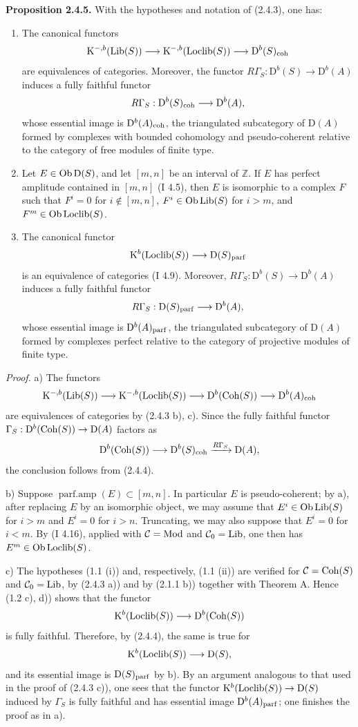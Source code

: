 \documentclass[11pt]{article}
\begin{document}
\textbf{Proposition 2.4.5.} With the hypotheses and notation of (2.4.3), one has:
\begin{enumerate}[label=\alph*)]
\item The canonical functors
\[
\mathrm K^{-,b}(\operatorname{Lib}(S))\longrightarrow\mathrm K^{-,b}(\operatorname{Loclib}(S))\longrightarrow \mathrm D^b(S)_{\mathrm{coh}}
\]
are equivalences of categories. Moreover, the functor $R\Gamma_S:\mathrm D^b(S)\to\mathrm D^b(A)$ induces a fully faithful functor
\[
R\Gamma_S:\mathrm D^b(S)_{\mathrm{coh}}\longrightarrow \mathrm D^b(A),
\]
whose essential image is $\mathrm D^b(A)_{\mathrm{coh}}$, the triangulated subcategory of $\mathrm D(A)$ formed by complexes with bounded cohomology and pseudo-coherent relative to the category of free modules of finite type.
\item Let $E\in\operatorname{Ob}\mathrm D(S)$, and let $[m,n]$ be an interval of $\mathbb Z$. If $E$ has perfect amplitude contained in $[m,n]$ (I 4.5), then $E$ is isomorphic to a complex $F$ such that $F^i=0$ for $i\notin[m,n]$, $F^i\in\operatorname{Ob}\operatorname{Lib}(S)$ for $i>m$, and $F^m\in\operatorname{Ob}\operatorname{Loclib}(S)$.
\item The canonical functor
\[
\mathrm K^b(\operatorname{Loclib}(S))\longrightarrow \mathrm D(S)_{\mathrm{parf}}
\]
is an equivalence of categories (I 4.9). Moreover, $R\Gamma_S:\mathrm D^b(S)\to\mathrm D^b(A)$ induces a fully faithful functor
\[
R\Gamma_S:\mathrm D(S)_{\mathrm{parf}}\longrightarrow\mathrm D^b(A),
\]
whose essential image is $\mathrm D^b(A)_{\mathrm{parf}}$, the triangulated subcategory of $\mathrm D(A)$ formed by complexes perfect relative to the category of projective modules of finite type.
\end{enumerate}

\emph{Proof.} a) The functors
\[
\mathrm K^{-,b}(\operatorname{Lib}(S))\longrightarrow\mathrm K^{-,b}(\operatorname{Loclib}(S))\longrightarrow
\mathrm D^b(\operatorname{Coh}(S))\longrightarrow\mathrm D^b(A)_{\mathrm{coh}}
\]
are equivalences of categories by (2.4.3 b), c). Since the fully faithful functor $\Gamma_S:\mathrm D^b(\operatorname{Coh}(S))\to\mathrm D(A)$ factors as
\[
\mathrm D^b(\operatorname{Coh}(S))\longrightarrow\mathrm D^b(S)_{\mathrm{coh}}\xrightarrow{R\Gamma_S}\mathrm D(A),
\]
the conclusion follows from (2.4.4).

b) Suppose $\operatorname{parf.amp}(E)\subset[m,n]$. In particular $E$ is pseudo-coherent; by a), after replacing $E$ by an isomorphic object, we may assume that $E^i\in\operatorname{Ob}\operatorname{Lib}(S)$ for $i>m$ and $E^i=0$ for $i>n$. Truncating, we may also suppose that $E^i=0$ for $i<m$. By (I 4.16), applied with $\mathcal C=\operatorname{Mod}$ and $\mathcal C_0=\operatorname{Lib}$, one then has $E^m\in\operatorname{Ob}\operatorname{Loclib}(S)$.

c) The hypotheses (1.1 (i)) and, respectively, (1.1 (ii)) are verified for $\mathcal C=\operatorname{Coh}(S)$ and $\mathcal C_0=\operatorname{Lib}$, by (2.4.3 a)) and by (2.1.1 b)) together with Theorem A. Hence (1.2 c), d)) shows that the functor
\[
\mathrm K^b(\operatorname{Loclib}(S))\longrightarrow\mathrm D^b(\operatorname{Coh}(S))
\]
is fully faithful. Therefore, by (2.4.4), the same is true for
\[
\mathrm K^b(\operatorname{Loclib}(S))\longrightarrow\mathrm D(S),
\]
and its essential image is $\mathrm D(S)_{\mathrm{parf}}$ by b). By an argument analogous to that used in the proof of (2.4.3 c)), one sees that the functor $\mathrm K^b(\operatorname{Loclib}(S))\to\mathrm D(S)$ induced by $\Gamma_S$ is fully faithful and has essential image $\mathrm D^b(A)_{\mathrm{parf}}$; one finishes the proof as in a).
\end{document}
